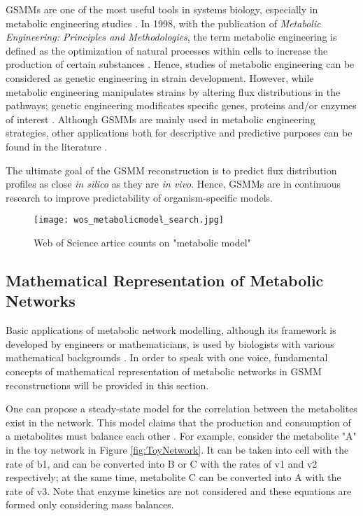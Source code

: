GSMMs are one of the most useful tools in systems biology, especially in metabolic engineering studies \cite{kim2012recent}. In 1998, with the publication of \emph{Metabolic Engineering: Principles and Methodologies}, the term metabolic engineering is defined as the optimization of natural processes within cells to increase the production of certain substances \cite{stephanopoulos1999metabolic}. Hence, studies of metabolic engineering can be considered as genetic engineering in strain development. However, while metabolic engineering manipulates strains by altering flux distributions in the pathways; genetic engineering modificates specific genes, proteins and/or enzymes of interest \cite{stephanopoulos2012synthetic}. Although GSMMs are mainly used in metabolic engineering strategies, other applications both for descriptive and predictive purposes can be found in the literature \cite{osterlund2012fifteen}.

The ultimate goal of the GSMM reconstruction is to predict flux distribution profiles as close \emph{in silico} as they are \emph{in vivo}. Hence, GSMMs are in continuous research to improve predictability of organism-specific models.

\begin{figure}[ht]
\begin{center}
\texttt{[image: wos\_metabolicmodel\_search.jpg]}
\end{center}
\caption[Web of Science artice counts on "metabolic model"]{Web of Science artice counts on "metabolic model"}
\label{fig:wos_metabolicmodel}
\end{figure}

\subsection{Mathematical Representation of Metabolic Networks}
Basic applications of metabolic network modelling, although its framework is developed by engineers or mathematicians, is used by biologists with various mathematical backgrounds \cite{pinzon2018mathematical}. In order to speak with one voice, fundamental concepts of mathematical representation of metabolic networks in GSMM reconstructions will be provided in this section.

One can propose a steady-state model for the correlation between the metabolites exist in the network. This model claims that the production and consumption of a metabolites must balance each other \cite{reimers2016steady}. For example, consider the metabolite "A" in the toy network in Figure \ref{fig:ToyNetwork}. It can be taken into cell with the rate of b1, and can be converted into B or C with the rates of v1 and v2 respectively; at the same time, metabolite C can be converted into A with the rate of v3. Note that enzyme kinetics are not considered and these equations are formed only considering mass balances.

